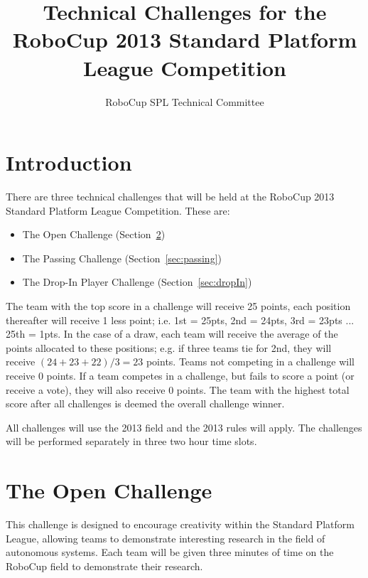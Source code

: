 \documentclass{article}
\begin{document}
\title{Technical Challenges for the RoboCup 2013 Standard Platform League Competition}

\author{RoboCup SPL Technical Committee}

\maketitle

\section{Introduction}
\label{sec:introduction}

There are three technical challenges that will be held at the RoboCup 
2013 Standard Platform League Competition. These are:

\begin{itemize}
\item The Open Challenge (Section~\ref{sec:open})
\item The Passing Challenge (Section~\ref{sec:passing})
\item The Drop-In Player Challenge (Section~\ref{sec:dropIn})
\end{itemize}

The team with the top score in a challenge will receive 25 points, each 
position thereafter will receive 1 less point; i.e. 1st = 25pts, 2nd = 24pts, 
3rd = 23pts ... 25th = 1pts. In the case of a draw, each team will receive 
the average of the points allocated to these positions; e.g. if three teams 
tie for 2nd, they will receive $(24+23+22)/3 = 23$ points. Teams not competing 
in a challenge will receive 0 points.  If a team competes in a challenge, but fails to 
score a point (or receive a vote), they will also receive 0 points. The team 
with the highest total score after all challenges is deemed the overall 
challenge winner.

All challenges will use the 2013 field and the 2013 rules will apply.  The 
challenges will be performed separately in three two hour time slots.

\section{The Open Challenge}
\label{sec:open}
\newcommand{\openMinNum}{three}

This challenge is designed to encourage creativity within the Standard 
Platform League, allowing teams to demonstrate interesting research in 
the field of autonomous systems. Each team will be given \openMinNum{} 
minutes of time on the RoboCup field to demonstrate their research.
\end{document}
